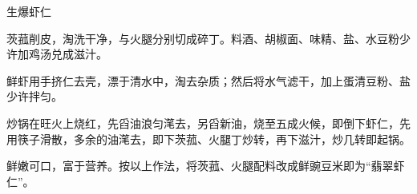 %
%
%
%
%
%
%
\begin{recipe}{生爆虾仁}

\ingredients


\preparation

\step 茨菰削皮，淘洗干净，与火腿分别切成碎丁。料酒、胡椒面、味精、盐、水豆粉少
许加鸡汤兑成滋汁。

\step 鲜虾用手挤仁去壳，漂于清水中，淘去杂质；然后将水气滤干，加上蛋清豆粉、盐
少许拌匀。

\step 炒锅在旺火上烧红，先舀油浪匀滗去，另舀新油，烧至五成火候，即倒下虾仁，先
用筷子滑散，多余的油滗去，即下茨菰、火腿丁炒转，再下滋汁，炒几转即起锅。

\features

鲜嫩可口，富于营养。按以上作法，将茨菰、火腿配料改成鲜豌豆米即为“翡翠虾仁”。

\end{recipe}

